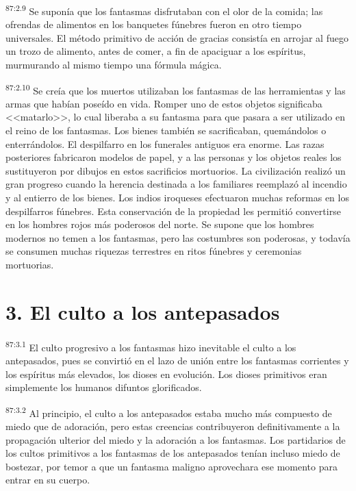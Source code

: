 \par
\textsuperscript{87:2.9} Se suponía que los fantasmas disfrutaban con el olor de la comida; las ofrendas de alimentos en los banquetes fúnebres fueron en otro tiempo universales. El método primitivo de acción de gracias consistía en arrojar al fuego un trozo de alimento, antes de comer, a fin de apaciguar a los espíritus, murmurando al mismo tiempo una fórmula mágica.

\par
\textsuperscript{87:2.10} Se creía que los muertos utilizaban los fantasmas de las herramientas y las armas que habían poseído en vida. Romper uno de estos objetos significaba <<matarlo>>, lo cual liberaba a su fantasma para que pasara a ser utilizado en el reino de los fantasmas. Los bienes también se sacrificaban, quemándolos o enterrándolos. El despilfarro en los funerales antiguos era enorme. Las razas posteriores fabricaron modelos de papel, y a las personas y los objetos reales los sustituyeron por dibujos en estos sacrificios mortuorios. La civilización realizó un gran progreso cuando la herencia destinada a los familiares reemplazó al incendio y al entierro de los bienes. Los indios iroqueses efectuaron muchas reformas en los despilfarros fúnebres. Esta conservación de la propiedad les permitió convertirse en los hombres rojos más poderosos del norte. Se supone que los hombres modernos no temen a los fantasmas, pero las costumbres son poderosas, y todavía se consumen muchas riquezas terrestres en ritos fúnebres y ceremonias mortuorias.

\section*{3. El culto a los antepasados}
\par
\textsuperscript{87:3.1} El culto progresivo a los fantasmas hizo inevitable el culto a los antepasados, pues se convirtió en el lazo de unión entre los fantasmas corrientes y los espíritus más elevados, los dioses en evolución. Los dioses primitivos eran simplemente los humanos difuntos glorificados.

\par
\textsuperscript{87:3.2} Al principio, el culto a los antepasados estaba mucho más compuesto de miedo que de adoración, pero estas creencias contribuyeron definitivamente a la propagación ulterior del miedo y la adoración a los fantasmas. Los partidarios de los cultos primitivos a los fantasmas de los antepasados tenían incluso miedo de bostezar, por temor a que un fantasma maligno aprovechara ese momento para entrar en su cuerpo.

